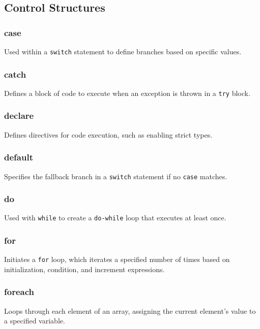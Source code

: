 \documentclass{report}
\begin{document}
\pagebreak
\subsection{Control Structures}
\bigbreak \noindent 
\subsubsection{case}
\bigbreak \noindent 
Used within a \texttt{switch} statement to define branches based on specific values.

\bigbreak \noindent 
\subsubsection{catch}
\bigbreak \noindent 
Defines a block of code to execute when an exception is thrown in a \texttt{try} block.

\bigbreak \noindent 
\subsubsection{declare}
\bigbreak \noindent 
Defines directives for code execution, such as enabling strict types.

\bigbreak \noindent 
\subsubsection{default}
\bigbreak \noindent 
Specifies the fallback branch in a \texttt{switch} statement if no \texttt{case} matches.

\bigbreak \noindent 
\subsubsection{do}
\bigbreak \noindent 
Used with \texttt{while} to create a \texttt{do-while} loop that executes at least once.

\bigbreak \noindent 
\subsubsection{for}
\bigbreak \noindent 
Initiates a \texttt{for} loop, which iterates a specified number of times based on initialization, condition, and increment expressions.

\bigbreak \noindent 
\subsubsection{foreach}
\bigbreak \noindent 
Loops through each element of an array, assigning the current element’s value to a specified variable.
\end{document}

